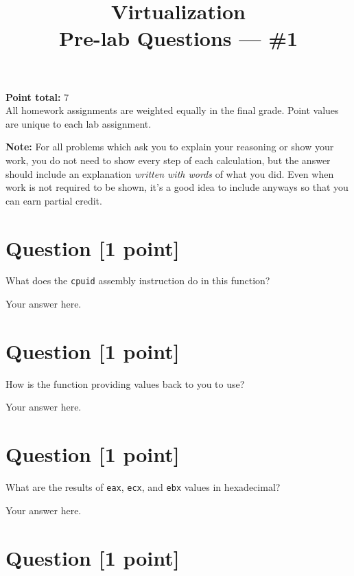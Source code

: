 \documentclass[11pt]{article}
\providecommand{\due}{}
\begin{document}
\title{Virtualization\\Pre-lab Questions --- \#1}
\date{\due}

\maketitle

\noindent \textbf{Point total:} 7
\\ All homework assignments are weighted equally in the final grade. Point values are unique to each lab assignment.

\textbf{Note:} For all problems which ask you to explain your reasoning or show your work, you do not need to show every step of each calculation, but the answer should include an explanation \emph{written with words} of what you did.  Even when work is not required to be shown, it’s a good idea to include anyways so that you can earn partial credit.

\section{Question [1 point]}

What does the \texttt{cpuid} assembly instruction do in this function?

\begin{solution}
Your answer here.
\end{solution}


\section{Question [1 point]}

How is the function providing values back to you to use?

\begin{solution}
Your answer here.
\end{solution}


\section{Question [1 point]}

What are the results of \texttt{eax}, \texttt{ecx}, and \texttt{ebx} values in hexadecimal?

\begin{solution}
Your answer here.
\end{solution}


\section{Question [1 point]}
\end{document}
